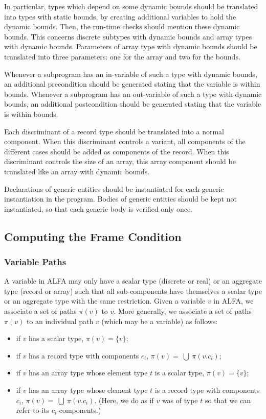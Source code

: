 \documentclass{article}
\newcommand{\bigunion}{~\bigcup~}
\newcommand{\vpath}[1]{\ensuremath{\pi(#1)}\xspace}
\begin{document}
In particular, types which depend on some dynamic bounds should be translated
into types with static bounds, by creating additional variables to hold the
dynamic bounds. Then, the run-time checks should mention these dynamic bounds.
This concerns discrete subtypes with dynamic bounds and array types with
dynamic bounds. Parameters of array type with dynamic bounds should be
translated into three parameters: one for the array and two for the bounds.

Whenever a subprogram has an in-variable of such a type with dynamic bounds, an
additional precondition should be generated stating that the variable is within
bounds.  Whenever a subprogram has an out-variable of such a type with dynamic
bounds, an additional postcondition should be generated stating that the
variable is within bounds.

Each discriminant of a record type should be translated into a normal
component. When this discriminant controls a variant, all components of the
different cases should be added as components of the record. When this
discriminant controls the size of an array, this array component should be
translated like an array with dynamic bounds.

Declarations of generic entities should be instantiated for each generic
instantiation in the program. Bodies of generic entities should be kept not
instantiated, so that each generic body is verified only once.

\subsection{Computing the Frame Condition}
\label{sub:data-flow}

\subsubsection{Variable Paths}
\label{sub:variable-path}

A variable in ALFA may only have a scalar type (discrete or real) or an
aggregate type (record or array) such that all sub-components have themselves a
scalar type or an aggregate type with the same restriction. Given a variable
$v$ in ALFA, we associate a set of paths \vpath{v} to $v$. More generally, we
associate a set of paths \vpath{v} to an individual path $v$ (which may be a
variable) as follows:
\begin{itemize}
\item if $v$ has a scalar type, $\vpath{v} = \{v\}$;
\item if $v$ has a record type with components $c_i$, 
  $\vpath{v} = \bigunion \vpath{v.c_i}$;
\item if $v$ has an array type whose element type $t$ is a scalar type,
  $\vpath{v} = \{v\}$;
\item if $v$ has an array type whose element type $t$ is a record type with
  components $c_i$, $\vpath{v} = \bigunion \vpath{v.c_i}$. (Here, we do as if $v$
  was of type $t$ so that we can refer to its $c_i$ components.)
\end{itemize}
\end{document}
